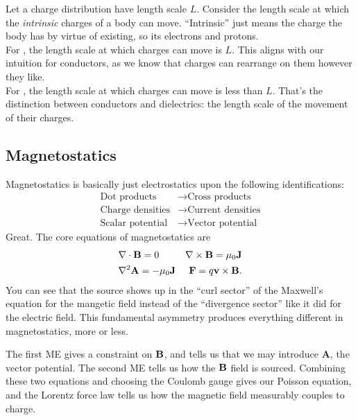\documentclass[11pt]{article}
\begin{document}
\begin{iidea}
    Let a charge distribution have length scale $L$.
    Consider the length scale at which the \emph{intrinsic} charges of a body
    can move. ``Intrinsic'' just means the charge the body has by virtue of existing,
    so its electrons and protons.\\

    For , the length scale at which charges can move is $L$.
    This aligns with our intuition for conductors, as we know that charges
    can rearrange on them however they like.\\

    For , the length scale at which charges can move is less
    than $L$. That's the distinction between conductors and dielectrics:
    the length scale of the movement of their charges.
\end{iidea}

\subsection{Magnetostatics}

Magnetostatics is basically just electrostatics
upon the following identifications:
\begin{align*}
    \text{Dot products} & \longrightarrow \text{Cross products}\\
    \text{Charge densities} & \longrightarrow \text{Current densities}\\
    \text{Scalar potential} & \longrightarrow \text{Vector potential}
\end{align*}
Great. The core equations of magnetostatics are
\begin{align*}
    & \nabla \cdot \mathbf{B} = 0 & \nabla \times \mathbf{B} = \mu_0 \mathbf{J}\\
    & \nabla^2 \mathbf{A} = - \mu_0 \mathbf{J} & \mathbf{F} = q \mathbf{v} \times \mathbf{B}.
\end{align*}
You can see that the source shows up in the ``curl sector'' of
the Maxwell's equation for the mangetic field instead of the ``divergence sector''
like it did for the electric field. This fundamental
asymmetry produces everything different in magnetostatics,
more or less.

The first ME gives a constraint on $\mathbf{B}$, and tells us that
we may introduce $\mathbf{A}$, the vector potential. The second
ME tells us how the $\mathbf{B}$ field is sourced. Combining these two
equations and choosing the Coulomb gauge gives our Poisson
equation, and the Lorentz force law tells us how the magnetic
field measurably couples to charge.
\end{document}
